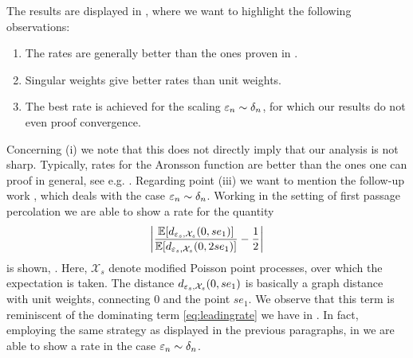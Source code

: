 %
%
The results are displayed in \cite[Fig. 1--Fig. 4]{bungert2021uniform}, where we want to highlight the following observations:
%
\begin{enumerate}[label=(\roman*)]
\item The rates are generally better than the ones proven in \cite[Thm. 2.2]{bungert2021uniform}.
\item Singular weights give better rates than unit weights.
\item  The best rate is achieved for the scaling $\varepsilon_n\sim\delta_n$, for which our results do not even proof convergence.
\end{enumerate}
%
%
Concerning (i) we note that this does not directly imply that our analysis is not sharp. Typically, rates for the Aronsson function are better than the ones one can proof in general, see e.g. \cite{smart2010infinity}. Regarding point (iii) we want to mention the follow-up work \cite{bungert2022ratio}, which deals with the case $\varepsilon_n\sim\delta_n$. Working in the setting of first passage percolation we are able to show a rate for the quantity
%
\begin{align*}
\left|\frac{\mathbb{E}[d_{\varepsilon_s,\mathcal{X}_s}(0,se_1)]}{\mathbb{E}[d_{\varepsilon_s,\mathcal{X}_s}(0,2se_1)]}
-\frac{1}{2}\right|
\end{align*}
%
is shown, \cite[Thm. 2.1]{bungert2022ratio}. Here, $\mathcal{X}_s$ denote modified Poisson point processes, over which the expectation is taken. The distance $d_{\varepsilon_s,\mathcal{X}_s}(0,se_1)$ is basically a graph distance with unit weights, connecting $0$ and the point $se_1$. We observe that this term is reminiscent of the dominating term \cref{eq:leadingrate} we have in \cite{bungert2022ratio}. In fact, employing the same strategy as displayed in the previous paragraphs, in \cite{bungert2022ratio} we are able to show a rate
in the case $\varepsilon_n\sim \delta_n$.
